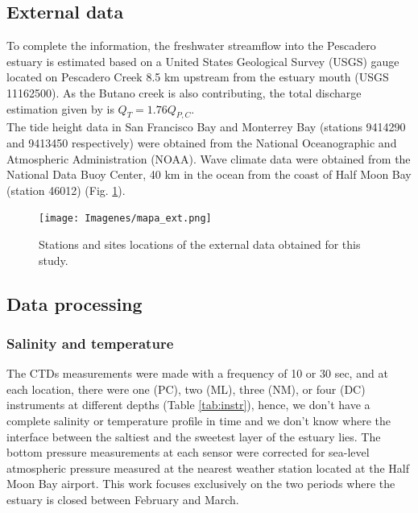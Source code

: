 \documentclass[tesis.tex]{subfiles}
\begin{document}
\subsection{External data}

To complete the information, the freshwater streamflow into the Pescadero estuary is estimated based on a United States Geological Survey (USGS) gauge located on Pescadero Creek 8.5 km upstream from the estuary mouth (USGS 11162500). As the Butano creek is also contributing, the total discharge estimation given by \cite{Williams2014} is $Q_{T} = 1.76 Q_{P,C}$. \\

The tide height data in San Francisco Bay and Monterrey Bay (stations 9414290 and 9413450 respectively) were obtained from the National Oceanographic and Atmospheric Administration (NOAA). Wave climate data were obtained from the National Data Buoy Center, 40 km in the ocean from the coast of Half Moon Bay (station 46012) (Fig. \ref{fig:mapext}). 

\begin{figure}[h!]
    \centering
    \texttt{[image: Imagenes/mapa\_ext.png]}
    \caption{Stations and sites locations of the external data obtained for this study.}
    \label{fig:mapext}
\end{figure}

\subsection{Data processing}

\subsubsection{Salinity and temperature}

The CTDs measurements were made with a frequency of 10 or 30 sec, and at each location, there were one (PC), two (ML), three (NM), or four (DC) instruments at different depths (Table \ref{tab:instr}), hence, we don't have a complete salinity or temperature profile in time and we don't know where the interface between the saltiest and the sweetest layer of the estuary lies. The bottom pressure measurements at each sensor were corrected for sea-level atmospheric pressure measured at the nearest weather station located at the Half Moon Bay airport. This work focuses exclusively on the two periods where the estuary is closed between February and March.\\
\end{document}
